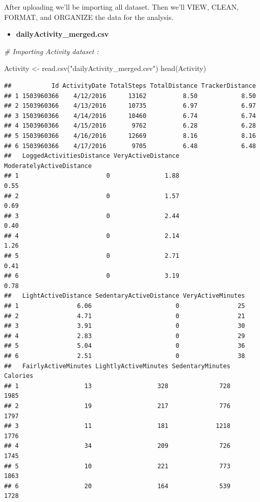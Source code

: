 \documentclass[
]{article}
\newenvironment{Shaded}{\begin{snugshade}}{\end{snugshade}}
\newcommand{\CommentTok}[1]{\textcolor[rgb]{0.56,0.35,0.01}{\textit{#1}}}
\newcommand{\FunctionTok}[1]{\textcolor[rgb]{0.00,0.00,0.00}{#1}}
\newcommand{\NormalTok}[1]{#1}
\newcommand{\OtherTok}[1]{\textcolor[rgb]{0.56,0.35,0.01}{#1}}
\newcommand{\StringTok}[1]{\textcolor[rgb]{0.31,0.60,0.02}{#1}}
\providecommand{\tightlist}{%
  \setlength{\itemsep}{0pt}\setlength{\parskip}{0pt}}
\begin{document}
After uploading we'll be importing all dataset. Then we'll VIEW, CLEAN,
FORMAT, and ORGANIZE the data for the analysis.

\begin{itemize}
\tightlist
\item
  \textbf{dailyActivity\_merged.csv}
\end{itemize}

\begin{Shaded}
\begin{Highlighting}[]
\CommentTok{\# Importing Activity dataset :}

\NormalTok{Activity }\OtherTok{\textless{}{-}} \FunctionTok{read.csv}\NormalTok{(}\StringTok{"dailyActivity\_merged.csv"}\NormalTok{)}
\FunctionTok{head}\NormalTok{(Activity)}
\end{Highlighting}
\end{Shaded}

\begin{verbatim}
##           Id ActivityDate TotalSteps TotalDistance TrackerDistance
## 1 1503960366    4/12/2016      13162          8.50            8.50
## 2 1503960366    4/13/2016      10735          6.97            6.97
## 3 1503960366    4/14/2016      10460          6.74            6.74
## 4 1503960366    4/15/2016       9762          6.28            6.28
## 5 1503960366    4/16/2016      12669          8.16            8.16
## 6 1503960366    4/17/2016       9705          6.48            6.48
##   LoggedActivitiesDistance VeryActiveDistance ModeratelyActiveDistance
## 1                        0               1.88                     0.55
## 2                        0               1.57                     0.69
## 3                        0               2.44                     0.40
## 4                        0               2.14                     1.26
## 5                        0               2.71                     0.41
## 6                        0               3.19                     0.78
##   LightActiveDistance SedentaryActiveDistance VeryActiveMinutes
## 1                6.06                       0                25
## 2                4.71                       0                21
## 3                3.91                       0                30
## 4                2.83                       0                29
## 5                5.04                       0                36
## 6                2.51                       0                38
##   FairlyActiveMinutes LightlyActiveMinutes SedentaryMinutes Calories
## 1                  13                  328              728     1985
## 2                  19                  217              776     1797
## 3                  11                  181             1218     1776
## 4                  34                  209              726     1745
## 5                  10                  221              773     1863
## 6                  20                  164              539     1728
\end{verbatim}
\end{document}
